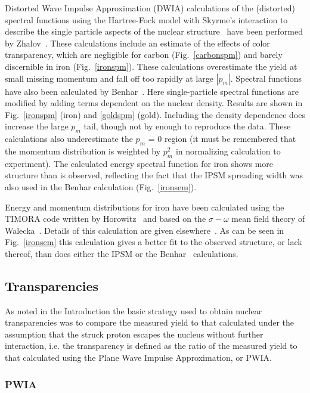 \documentclass[aps,prl,twocolumn,showpacs,amsmath,amssymb,floats]{revtex4}
\begin{document}
Distorted Wave Impulse Approximation (DWIA) calculations of the (distorted) 
spectral functions using the Hartree-Fock model with Skyrme's interaction to 
describe the single particle aspects of the nuclear structure~\cite{llf94} have 
been performed by Zhalov~\cite{zalsf}.  These calculations include an estimate 
of the effects of color transparency, which are negligible for carbon 
(Fig.~\ref{carbonspm}) and barely discernible in iron (Fig.~\ref{ironspm}). 
These calculations overestimate the yield at small missing momentum and fall off 
too rapidly at large $|p_m|$. 
Spectral functions have also been calculated by Benhar~\cite{benharsf}.  Here 
single-particle spectral functions are modified by adding terms dependent on 
the nuclear density.  Results are shown in Fig.~\ref{ironspm} (iron) and 
\ref{goldspm} (gold).  Including the density dependence does increase the large 
$p_m$ tail, though not
by enough to reproduce the data.  These calculations also underestimate the 
$p_m$ = 0 region (it must be remembered that the momentum distribution is 
weighted by $p_m^2$ in normalizing calculation to experiment).  The calculated 
energy spectral function for iron shows more structure than is observed, 
reflecting the fact that the IPSM spreading width was also used in the Benhar 
calculation (Fig.~\ref{ironsem}). 

Energy and momentum distributions for iron have been calculated using the TIMORA 
code written by Horowitz~\cite{hor81} and based on the $\sigma - \omega$ mean 
field theory of Walecka~\cite{wel74}.  Details of this calculation are given 
elsewhere~\cite{derekth}.  As can be seen in Fig.~\ref{ironsem} this calculation 
gives a better fit to the observed structure, or lack thereof, than does either 
the IPSM or the Benhar~\cite{benharsf} calculations.


\subsection*{Transparencies}

As noted in the Introduction the basic strategy used to obtain nuclear 
transparencies was to compare the measured yield to that calculated under the 
assumption that the struck proton escapes the nucleus without further 
interaction, i.e. the transparency is defined as the ratio of the measured yield 
to that calculated using the Plane Wave Impulse Approximation, or PWIA.

\subsubsection*{PWIA}
\end{document}
